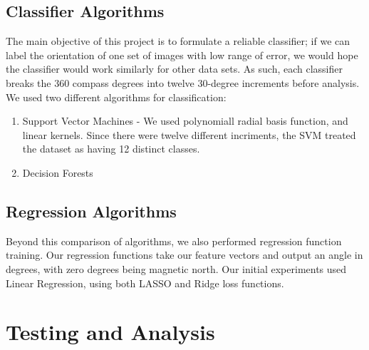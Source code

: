 \documentclass{article}
\begin{document}
\subsection{Classifier Algorithms}
The main objective of this project is to formulate a reliable classifier; if we can label the orientation of one set of images with low range of error, we would hope the classifier would work similarly for other data sets. As such, each classifier breaks the 360 compass degrees into twelve 30-degree increments before analysis. We used two different algorithms for classification: 
\begin{enumerate}[1.]
\item Support Vector Machines - We used polynomiall radial basis function, and linear kernels. Since there were twelve different incriments, the SVM treated the dataset as having 12 distinct classes. 
\item Decision Forests
\end{enumerate}

\subsection{Regression Algorithms}
Beyond this comparison of algorithms, we also performed regression function training. Our regression functions take our feature vectors and output an angle in degrees, with zero degrees being magnetic north. Our initial experiments used Linear Regression, using both LASSO and Ridge loss functions. 

\section{Testing and Analysis}
\end{document}
